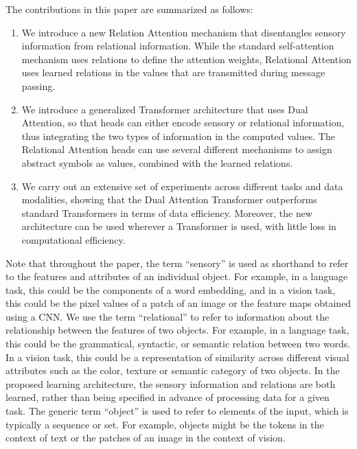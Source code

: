 The contributions in this paper are summarized as follows:
\begin{enumerate}
  \item We introduce a new Relation Attention mechanism that disentangles sensory information from relational information. While the standard self-attention mechanism uses relations to define the attention weights, Relational Attention uses learned relations in the values that are transmitted during message passing. 
  \item We introduce a generalized Transformer architecture that uses Dual Attention, so that heads can either encode sensory or relational information, thus integrating the two types of information in the computed values. The Relational Attention heads can use several different mechanisms to assign abstract symbols as values, combined with the learned relations. 
  \item We carry out an extensive set of experiments across different tasks and data modalities, showing that the Dual Attention Transformer outperforms standard Transformers in terms of data efficiency. Moreover, the new architecture can be used wherever a Transformer is used, with little loss in computational efficiency.
\end{enumerate}

Note that throughout the paper, the term ``sensory'' is used as shorthand to refer to the features and attributes of an individual object. For example, in a language task, this could be the components of a word embedding, and in a vision task, this could be 
the pixel values of a patch of an image or the feature maps obtained using a CNN. We use the term ``relational'' to refer to information about the relationship between the features of two objects. For example, in a language task, this could be the grammatical, syntactic, or semantic relation between two words. In a vision task, this could be a representation of similarity across different visual attributes such as the color, texture 
or semantic category of two objects. In the proposed learning architecture, 
the sensory information and relations are both learned, rather than being specified in advance of processing data for a given task.  The generic term ``object'' 
is used to refer to elements of the input, which is typically a sequence or set. 
For example, objects might be the tokens in the context of text or the patches of an image in the context of vision.

